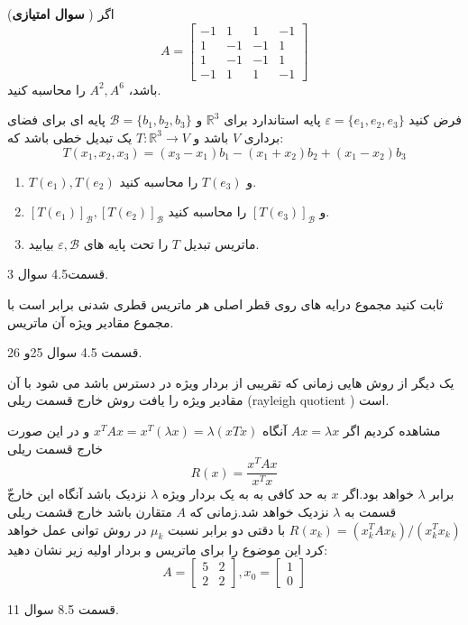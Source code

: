 \documentclass{article}
\begin{document}
	
	
	({\bf سوال امتیازی })
	اگر 
	$$A=
	\begin{bmatrix}
	-1&1&1&-1\\
	1&-1&-1&1\\
	1&-1&-1&1\\
	-1&1&1&-1
	\end{bmatrix}$$
	باشد،
	$A^2,A^6$
	را محاسبه کنید.
	
	
	فرض کنید
	$\varepsilon=\{e_1,e_2,e_3\}$
	پایه استاندارد برای 
	$\mathbb{R}^3$
	و 
	$\mathcal{B}=\{b_1,b_2,b_3\}$
	پایه ای برای فضای برداری 
	$V$
	باشد و 
	$T:\mathbb{R}^3\longrightarrow V$
	یک تبدیل خطی باشد که:
	$$T(x_1,x_2,x_3)=(x_3-x_1)b_1-(x_1+x_2)b_2+(x_1-x_2)b_3$$
	\begin{enumerate}
		\item 
		$T(e_1),T(e_2)$
		و 
		$T(e_3)$
		را محاسبه کنید.
		\item 
		$[T(e_1)]_{\mathcal{B}},[T(e_2)]_{\mathcal{B}}$
		و 
		$[T(e_3)]_{\mathcal{B}}$
		را محاسبه کنید.
		\item 
		ماتریس تبدیل 
		$T$
		را تحت پایه های 
		$\varepsilon,\mathcal{B}$
		بیابید.
		
		
		
	\end{enumerate}
	\begin{حل}
		قسمت4.5 سوال 3.
	\end{حل}
	
	
	
	ثابت کنید مجموع درایه های روی قطر اصلی هر ماتریس قطری شدنی برابر است با مجموع مقادیر ویژه آن ماتریس.
	\begin{حل}
		قسمت 4.5 سوال 25و 26.
	\end{حل}
	
	
	
	 یک دیگر از روش هایی  زمانی که تقریبی از بردار ویژه در دسترس باشد می شود با آن مقادیر ویژه را یافت 
	روش خارج قسمت ریلی 
	({\lr rayleigh quotient })
	است. 
	
	مشاهده کردیم اگر 
	$Ax=\lambda x$
	آنگاه 
	$x^TAx=x^T(\lambda x)=\lambda(xTx)$
	و در این صورت خارج قسمت ریلی 
	$$R(x)=\frac{x^TAx}{x^Tx}$$
	ّبرابر
	$\lambda$
	خواهد بود.اگر 
	$x$
	به حد کافی به به یک بردار ویژه 
	$\lambda$
	نزدیک باشد آنگاه این خارج قسمت به 
	$\lambda$
	نزدیک خواهد شد.زمانی که 
	$A$
	متقارن باشد خارج قشمت ریلی 
	$R(x_k)=(x^T_kAx_k)/(x^T_kx_k)$
	با دقتی دو برابر نسبت 
	$\mu_k$
	در روش توانی عمل خواهد کرد این موضوع را برای ماتریس و بردار اولیه زیر نشان دهید:
	$$A=\begin{bmatrix}
	5&2\\
	2&2
	\end{bmatrix},x_0=\begin{bmatrix}
	1\\
	0
	\end{bmatrix}$$
	\begin{حل}
		قسمت 8.5 سوال 11.
	\end{حل}
	
\end{document}
